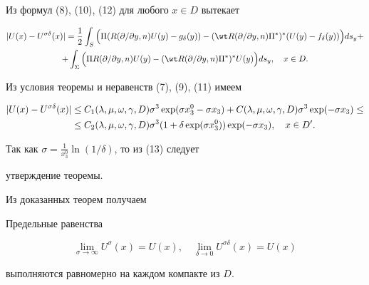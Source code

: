 \begin{pf} 


Из формул (8), (10), (12) для любого $x\in D$ вытекает 


\begin{multline*} 


|U(x)-U^{\sigma\delta}(x)|=\frac{1}{2}\int_S 


\Big(\Pi(R(\partial/\partial y,n)U(y)-g_\delta(y))- 


(\wt R(\partial/\partial y,n)\Pi^*)^*(U(y)- 


f_\delta(y))\Big)ds_y+ \\ 


+\int_\Sigma\Big(\Pi R(\partial/\partial y,n)U(y)- 


(\wt R(\partial/\partial y,n)\Pi^*)^*U(y)\Big)ds_y,\quad x\in D. 


\end{multline*} 


Из условия теоремы и неравенств (7), (9), (11) имеем 


\begin{align} 


|U(x)-U^{\sigma\delta}(x)|&\le C_1(\lambda,\mu,\omega,\gamma,D) 


\sigma^3\exp(\sigma x^0_3-\sigma x_3)+ 


C(\lambda,\mu,\omega,\gamma,D)\sigma^3\exp(-\sigma x_3)\le\notag\\ 


&\le C_2(\lambda,\mu,\omega,\gamma,D)\sigma^3 


(1+\delta\exp(\sigma x^0_3))\exp(-\sigma x_3),\quad x\in D'. 


\end{align} 


Так как $\sigma=\frac{1}{x^0_3}\ln(1/\delta)$, то из (13) следует 


утверждение теоремы. 


\end{pf} 





Из доказанных теорем получаем


 


\begin{cornonum} 


Предельные равенства 


$$ 


\lim_{\sigma\to\infty}U^\sigma(x)=U(x),\quad 


\lim_{\delta\to 0}U^{\sigma\delta}(x)=U(x) 


$$ 


выполняются равномерно на каждом компакте из $D$. 


\end{cornonum} 



